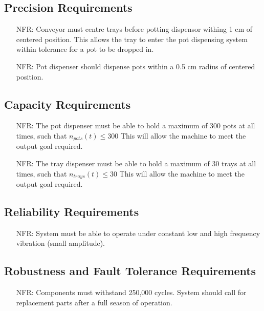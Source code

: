 \documentclass[12pt]{article}
\newcounter{nfrnum} %
\begin{document}
  \subsection{Precision Requirements}
  \noindent \begin{itemize}
  \item[NFR\refstepcounter{nfrnum}\thenfrnum \label{NFR_Precision1}:]
  Conveyor must centre trays before potting dispensor withing 1 cm of centered position. This allows the tray to enter the pot dispensing system within tolerance for a pot to be dropped in.
  
  \item[NFR\refstepcounter{nfrnum}\thenfrnum \label{NFR_Precision2}:]
  Pot dispenser should dispense pots within a 0.5 cm radius of centered position.

  \end{itemize}


  \subsection{Capacity Requirements}
  \noindent \begin{itemize}
  \item[NFR\refstepcounter{nfrnum}\thenfrnum \label{NFR_Capacity1}:] {The pot dispenser must
  be able to hold a maximum of 300 pots at all times, such that 
  $n_{pots}(t)\le300$} 
  This will allow the machine to meet the output goal required.

  \item[NFR\refstepcounter{nfrnum}\thenfrnum \label{NFR_Capacity2}:] {The tray dispenser must
  be able to hold a maximum of 30 trays at all times, such that 
  $n_{trays}(t)\le30$} 
  This will allow the machine to meet the output goal required.

  \end{itemize}


  \subsection{Reliability Requirements}
  \noindent \begin{itemize}
  \item[NFR\refstepcounter{nfrnum}\thenfrnum \label{NFR_Realiability1}:]
  System must be able to operate under constant low and high frequency vibration (small amplitude).
  
  \end{itemize}


  \subsection{Robustness and Fault Tolerance Requirements}
  \noindent \begin{itemize}
  \item[NFR\refstepcounter{nfrnum}\thenfrnum \label{NFR_Robustness1}:]
  Components must withstand 250,000 cycles. System should call for replacement parts after a full season of operation.
  
  \end{itemize}
\end{document}
